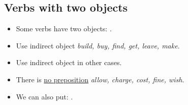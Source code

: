 \subsection{Verbs with two objects}
\begin{itemize}
    \item Some verbs have two objects: .
    \item Use   indirect object  \textit{build, buy, find, get, leave, make}.
    \item Use   indirect object in other cases.
    \item[\doot] There is \underline{no preposition}  \textit{allow, charge, cost, fine, wish}.
    \item We can also put: .
\end{itemize}

